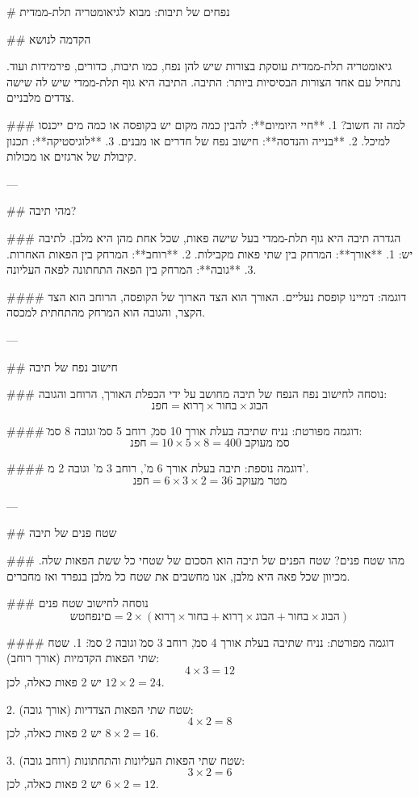 # נפחים של תיבות: מבוא לגיאומטריה תלת-ממדית

## הקדמה לנושא

גיאומטריה תלת-ממדית עוסקת בצורות שיש להן נפח, כמו תיבות, כדורים, פירמידות ועוד. נתחיל עם אחד הצורות הבסיסיות ביותר: התיבה. התיבה היא גוף תלת-ממדי שיש לה שישה צדדים מלבניים.

### למה זה חשוב?
1. **חיי היומיום**: להבין כמה מקום יש בקופסה או כמה מים ייכנסו למיכל.
2. **בנייה והנדסה**: חישוב נפח של חדרים או מבנים.
3. **לוגיסטיקה**: תכנון קיבולת של ארגזים או מכולות.

---

## מהי תיבה?

### הגדרה
תיבה היא גוף תלת-ממדי בעל שישה פאות, שכל אחת מהן היא מלבן. לתיבה יש:
1. **אורך**: המרחק בין שתי פאות מקבילות.
2. **רוחב**: המרחק בין הפאות האחרות.
3. **גובה**: המרחק בין הפאה התחתונה לפאה העליונה.

#### דוגמה:
דמיינו קופסת נעליים. האורך הוא הצד הארוך של הקופסה, הרוחב הוא הצד הקצר, והגובה הוא המרחק מהתחתית למכסה.

---

## חישוב נפח של תיבה

### נוסחה לחישוב נפח
הנפח של תיבה מחושב על ידי הכפלת האורך, הרוחב והגובה:
\[
נפח = אורך \times רוחב \times גובה
\]

#### דוגמה מפורטת:
נניח שתיבה בעלת אורך 10 ס\"מ, רוחב 5 ס\"מ וגובה 8 ס\"מ:
\[
נפח = 10 \times 5 \times 8 = 400 \text{ ס\"מ מעוקב}
\]

#### דוגמה נוספת:
תיבה בעלת אורך 6 מ', רוחב 3 מ' וגובה 2 מ'.
\[
נפח = 6 \times 3 \times 2 = 36 \text{ מטר מעוקב}
\]

---

## שטח פנים של תיבה

### מהו שטח פנים?
שטח הפנים של תיבה הוא הסכום של שטחי כל ששת הפאות שלה. מכיוון שכל פאה היא מלבן, אנו מחשבים את שטח כל מלבן בנפרד ואז מחברים.

### נוסחה לחישוב שטח פנים
\[
שטח פנים = 2 \times (אורך \times רוחב + אורך \times גובה + רוחב \times גובה)
\]

#### דוגמה מפורטת:
נניח שתיבה בעלת אורך 4 ס\"מ, רוחב 3 ס\"מ וגובה 2 ס\"מ:
1. שטח שתי הפאות הקדמיות (אורך \times רוחב):
   \[
   4 \times 3 = 12
   \]
   יש 2 פאות כאלה, לכן $12 \times 2 = 24$.

2. שטח שתי הפאות הצדדיות (אורך \times גובה):
   \[
   4 \times 2 = 8
   \]
   יש 2 פאות כאלה, לכן $8 \times 2 = 16$.

3. שטח שתי הפאות העליונות והתחתונות (רוחב \times גובה):
   \[
   3 \times 2 = 6
   \]
   יש 2 פאות כאלה, לכן $6 \times 2 = 12$.

